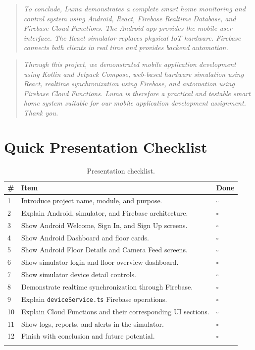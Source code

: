 \documentclass[11pt,a4paper]{article}
\begin{document}
\begin{quote}
\textit{To conclude, Luma demonstrates a complete smart home monitoring and control system using Android, React, Firebase Realtime Database, and Firebase Cloud Functions. The Android app provides the mobile user interface. The React simulator replaces physical IoT hardware. Firebase connects both clients in real time and provides backend automation.}
\end{quote}

\begin{quote}
\textit{Through this project, we demonstrated mobile application development using Kotlin and Jetpack Compose, web-based hardware simulation using React, realtime synchronization using Firebase, and automation using Firebase Cloud Functions. Luma is therefore a practical and testable smart home system suitable for our mobile application development assignment. Thank you.}
\end{quote}

\section{Quick Presentation Checklist}

\begin{longtable}{@{}p{0.8cm}p{11.2cm}p{1.2cm}@{}}
\toprule
\textbf{\#} & \textbf{Item} & \textbf{Done} \\
\midrule
\endhead
1 & Introduce project name, module, and purpose. & $\square$ \\
2 & Explain Android, simulator, and Firebase architecture. & $\square$ \\
3 & Show Android Welcome, Sign In, and Sign Up screens. & $\square$ \\
4 & Show Android Dashboard and floor cards. & $\square$ \\
5 & Show Android Floor Details and Camera Feed screens. & $\square$ \\
6 & Show simulator login and floor overview dashboard. & $\square$ \\
7 & Show simulator device detail controls. & $\square$ \\
8 & Demonstrate realtime synchronization through Firebase. & $\square$ \\
9 & Explain \texttt{deviceService.ts} Firebase operations. & $\square$ \\
10 & Explain Cloud Functions and their corresponding UI sections. & $\square$ \\
11 & Show logs, reports, and alerts in the simulator. & $\square$ \\
12 & Finish with conclusion and future potential. & $\square$ \\
\bottomrule
\caption{Presentation checklist.}
\label{tab:presentation-checklist}
\end{longtable}
\end{document}

